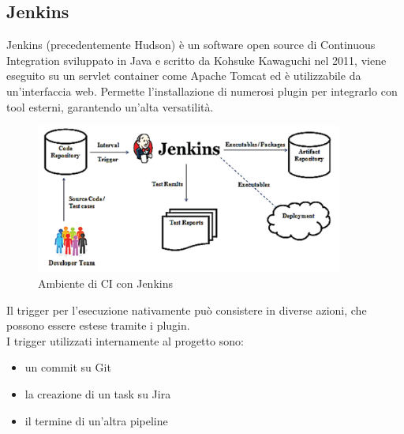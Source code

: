 \documentclass[a4paper, 12pt]{report}
\numberwithin{equation}{section}
\begin{document}
\subsection{Jenkins}
Jenkins (precedentemente Hudson) è un software open source di Continuous Integration sviluppato in Java e scritto da Kohsuke Kawaguchi nel 2011, viene eseguito su un servlet container come Apache Tomcat ed è utilizzabile da un’interfaccia web. Permette l’installazione di numerosi plugin per integrarlo con tool esterni, garantendo un’alta versatilità.
\begin{figure}
    \centering
    \includegraphics[width=0.9\textwidth]{imgs/ambiente-ci-jenkins.png}
    \caption{Ambiente di CI con Jenkins \cite{ci-env}}
    \label{fig:ambiente-ci-jenkins}
\end{figure}
Il trigger per l’esecuzione nativamente può consistere in diverse azioni, che possono essere estese tramite i plugin.\\ 
I trigger utilizzati internamente al progetto sono:
\begin{itemize}
    \item un commit su Git
    \item la creazione di un task su Jira
    \item il termine di un’altra pipeline
\end{itemize}
\end{document}
